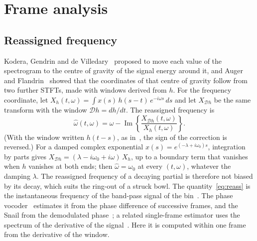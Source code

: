 \documentclass[10pt,a4paper,twocolumn]{article}
\renewcommand{\Im}{\operatorname{Im}}
\begin{document}
\section{Frame analysis}
\label{sec:frame}

\subsection{Reassigned frequency}

Kodera, Gendrin and de Villedary~\cite{Kodera76,Kodera78} proposed to move each value of the spectrogram to the centre of gravity of the signal energy around it, and Auger and Flandrin~\cite{AugerFlandrin} showed that the coordinates of that centre of gravity follow from two further STFTs, made with windows derived from $h$. For the frequency coordinate, let $X_h(t,\omega) = \int x(s)\, h(s-t)\, e^{-i\omega s}\, ds$ and let $X_{\mathcal{D}h}$ be the same transform with the window $\mathcal{D}h = dh/dt$. The reassigned frequency is
\begin{equation}
\hat\omega(t,\omega) = \omega - \Im\left\{ \frac{X_{\mathcal{D}h}(t,\omega)}{X_h(t,\omega)} \right\}.
\label{eq:reass}
\end{equation}
(With the window written $h(t-s)$, as in~\cite{AugerFlandrin}, the sign of the correction is reversed.) For a damped complex exponential $x(s) = e^{(-\lambda + i\omega_0)s}$, integration by parts gives $X_{\mathcal{D}h} = (\lambda - i\omega_0 + i\omega)\,X_h$, up to a boundary term that vanishes when $h$ vanishes at both ends; then $\hat\omega = \omega_0$ at every $(t,\omega)$, whatever the damping $\lambda$. The reassigned frequency of a decaying partial is therefore not biased by its decay, which suits the ring-out of a struck bowl. The quantity~\eqref{eq:reass} is the instantaneous frequency of the band-pass signal of the bin~\cite{Kodera78,AugerFlandrin,FulopFitz}. The phase vocoder~\cite{FlanaganGolden} estimates it from the phase difference of successive frames, and the Snail from the demodulated phase~\cite{HelieTimbre}; a related single-frame estimator uses the spectrum of the derivative of the signal~\cite{DesainteCatherine}. Here it is computed within one frame from the derivative of the window.
\end{document}
